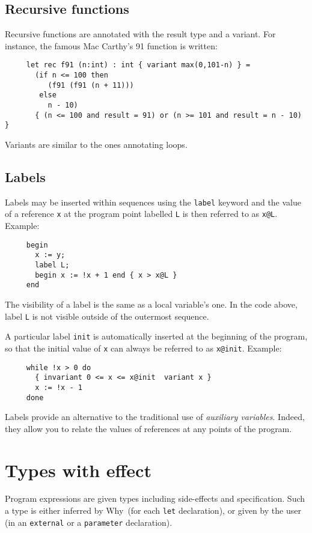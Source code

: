 \documentclass[a4paper,12pt]{report}
\makeatletter
\newcommand{\why}{\textsf{Why}}
\newcommand{\te}[1]{\texttt{#1}}
\newcommand{\indextt}[1]{\index{#1@\texttt{#1}}}
\makeatother
\begin{document}
\subsection{Recursive functions}
Recursive functions are annotated with the result type and a variant.
For instance, the famous Mac Carthy's 91 function is written:
\begin{verbatim}
     let rec f91 (n:int) : int { variant max(0,101-n) } =
       (if n <= 100 then
          (f91 (f91 (n + 11)))
        else
          n - 10)
       { (n <= 100 and result = 91) or (n >= 101 and result = n - 10) }
\end{verbatim}
Variants are similar to the ones annotating loops.

\subsection{Labels}
Labels may be inserted within sequences using the 
\te{label} keyword and the value of a reference \texttt{x} at the
program point labelled \texttt{L} is then referred to as \texttt{x@L}.
Example:
\begin{verbatim}
     begin 
       x := y;
       label L; 
       begin x := !x + 1 end { x > x@L }
     end
\end{verbatim}
The visibility of a label is the same as a local variable's one. In
the code above, label \texttt{L} is not visible outside of the
outermost sequence.

\indextt{init}
A particular label \texttt{init} is automatically inserted at the
beginning of the program, so that the initial value of \texttt{x}
can always be referred to as \texttt{x@init}. 
Example:
\begin{verbatim}
     while !x > 0 do 
       { invariant 0 <= x <= x@init  variant x } 
       x := !x - 1 
     done
\end{verbatim}

Labels provide an alternative to the traditional use of
\emph{auxiliary variables}. Indeed, they
allow you to relate the values of references at any points of the
program. 


\section{Types with effect}
\label{types}

Program expressions are given types including side-effects and
specification. Such a type is either inferred by \why\ (for each
\texttt{let} declaration), or given by the user (in an
\texttt{external} or a \texttt{parameter} declaration).
\end{document}
